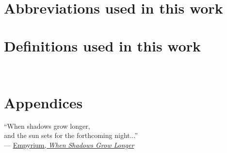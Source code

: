 \documentclass[12pt, twoside, openright]{report}
\begin{document}
\newpage
\noindent


\cleardoublepage

\newpage
\thispagestyle{plain}
~\newpage


\smaller{


}


\chapter*{\vspace*{-4cm}Abbreviations used in this work}
\label{chapter: abbreviations}



\chapter*{\vspace*{-4cm}Definitions used in this work}
\label{chapter: definitions}


\newpage
\thispagestyle{plain}
~\newpage


\chapter*{Appendices}
\vspace*{2cm}
\vbox{\large``When shadows grow longer,\\
and the sun sets for the forthcoming night...''\\

--- \href{https://empyrium.bandcamp.com/album/where-at-night-the-wood-grouse-plays}{Empyrium, \textit{When Shadows Grow Longer}}}

\newpage
\end{document}
